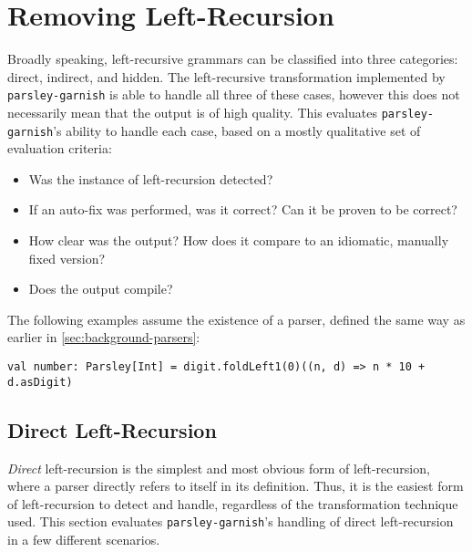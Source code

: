\documentclass[../../main.tex]{subfiles}
\begin{document}
\section{Removing Left-Recursion}\label{sec:eval-leftrec}
Broadly speaking, left-recursive grammars can be classified into three categories: direct, indirect, and hidden.
The left-recursive transformation implemented by \texttt{parsley-garnish} is able to handle all three of these cases, however this does not necessarily mean that the output is of high quality.
This  evaluates \texttt{parsley-garnish}'s ability to handle each case, based on a mostly qualitative set of evaluation criteria:
\begin{itemize}
  \item Was the instance of left-recursion detected?
  \item If an auto-fix was performed, was it correct? Can it be proven to be correct?
  \item How clear was the output? How does it compare to an idiomatic, manually fixed version?
  \item Does the output compile?
\end{itemize}
%
The following examples assume the existence of a  parser, defined the same way as earlier in \cref{sec:background-parsers}:
\begin{verbatim}
val number: Parsley[Int] = digit.foldLeft1(0)((n, d) => n * 10 + d.asDigit)
\end{verbatim}

\subsection{Direct Left-Recursion}
\emph{Direct} left-recursion is the simplest and most obvious form of left-recursion, where a parser directly refers to itself in its definition.
Thus, it is the easiest form of left-recursion to detect and handle, regardless of the transformation technique used.
This section evaluates \texttt{parsley-garnish}'s handling of direct left-recursion in a few different scenarios.
\end{document}

